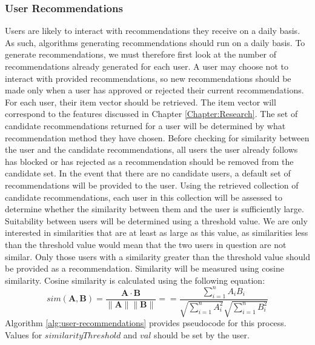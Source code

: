 \subsubsection{User Recommendations}
\label{sec:user-recommendations}
Users are likely to interact with recommendations they receive on a daily basis. As such, algorithms generating recommendations should run on a daily basis. To generate recommendations, we must therefore first look at the number of recommendations already generated for each user. A user may choose not to interact with provided recommendations, so new recommendations should be made only when a user has approved or rejected their current recommendations. For each user, their item vector should be retrieved. The item vector will correspond to the features discussed in Chapter \ref{Chapter:Research}. The set of candidate recommendations returned for a user will be determined by what recommendation method they have chosen. Before checking for similarity between the user and the candidate recommendations, all users the user already follows has blocked or has rejected as a recommendation should be removed from the candidate set. In the event that there are no candidate users, a default set of recommendations will be provided to the user. Using the retrieved collection of candidate recommendations, each user in this collection will be assessed to determine whether the similarity between them and the user is sufficiently large. Suitability between users will be determined using a threshold value. We are only interested in similarities that are at least as large as this value, as similarities less than the threshold value would mean that the two users in question are not similar. Only those users with a similarity greater than the threshold value should be provided as a recommendation. Similarity will be measured using cosine similarity. Cosine similarity is calculated using the following equation:
\begin{equation}
sim(\mathbf{A},\mathbf{B}) = \frac{\mathbf{A} \cdot \mathbf{B}}{\parallel\mathbf{A}\parallel \parallel\mathbf{B}\parallel} = = \frac{ \sum\limits_{i=1}^{n}{A_i  B_i} }{ \sqrt{\sum\limits_{i=1}^{n}{A_i^2}}  \sqrt{\sum\limits_{i=1}^{n}{B_i^2}} }
\label{eq:cos-similarity}
\end{equation}
Algorithm \ref{alg:user-recommendations} provides pseudocode for this process. Values for $similarityThreshold$ and $val$ should be set by the user.

